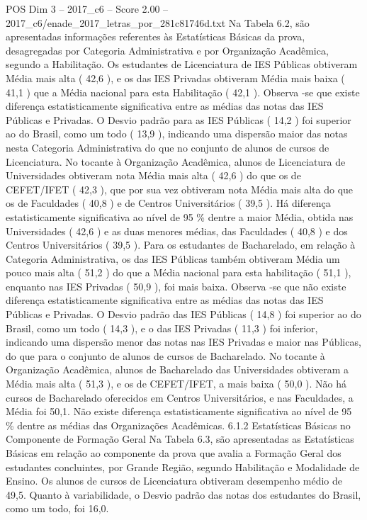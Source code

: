 \begin{textsample}{POS Dim 3 – 2017\_c6 – Score 2.00 – 2017\_c6/enade\_2017\_letras\_por\_281c81746d.txt}
Na Tabela 6.2, são apresentadas informações referentes às Estatísticas Básicas da prova, desagregadas por Categoria Administrativa e por Organização Acadêmica, segundo a Habilitação.
Os estudantes de Licenciatura de IES Públicas obtiveram Média mais alta ( 42,6 ), e os das IES Privadas obtiveram Média mais baixa ( 41,1 ) que a Média nacional para esta Habilitação ( 42,1 ).
Observa -se que existe diferença estatisticamente significativa entre as médias das notas das IES Públicas e Privadas.
O Desvio padrão para as IES Públicas ( 14,2 ) foi superior ao do Brasil, como um todo ( 13,9 ), indicando uma dispersão maior das notas nesta Categoria Administrativa do que no conjunto de alunos de cursos de Licenciatura.
No tocante à Organização Acadêmica, alunos de Licenciatura de Universidades obtiveram nota Média mais alta ( 42,6 ) do que os de CEFET/IFET ( 42,3 ), que por sua vez obtiveram nota Média mais alta do que os de Faculdades ( 40,8 ) e de Centros Universitários ( 39,5 ).
Há diferença estatisticamente significativa ao nível de 95 \% dentre a maior Média, obtida nas Universidades ( 42,6 ) e as duas menores médias, das Faculdades ( 40,8 ) e dos Centros Universitários ( 39,5 ).
Para os estudantes de Bacharelado, em relação à Categoria Administrativa, os das IES Públicas também obtiveram Média um pouco mais alta ( 51,2 ) do que a Média nacional para esta habilitação ( 51,1 ), enquanto nas IES Privadas ( 50,9 ), foi mais baixa.
Observa -se que não existe diferença estatisticamente significativa entre as médias das notas das IES Públicas e Privadas.
O Desvio padrão das IES Públicas ( 14,8 ) foi superior ao do Brasil, como um todo ( 14,3 ), e o das IES Privadas ( 11,3 ) foi inferior, indicando uma dispersão menor das notas nas IES Privadas e maior nas Públicas, do que para o conjunto de alunos de cursos de Bacharelado.
No tocante à Organização Acadêmica, alunos de Bacharelado das Universidades obtiveram a Média mais alta ( 51,3 ), e os de CEFET/IFET, a mais baixa ( 50,0 ).
Não há cursos de Bacharelado oferecidos em Centros Universitários, e nas Faculdades, a Média foi 50,1.
Não existe diferença estatisticamente significativa ao nível de 95 \% dentre as médias das Organizações Acadêmicas. 6.1.2 Estatísticas Básicas no Componente de Formação Geral Na Tabela 6.3, são apresentadas as Estatísticas Básicas em relação ao componente da prova que avalia a Formação Geral dos estudantes concluintes, por Grande Região, segundo Habilitação e Modalidade de Ensino.
Os alunos de cursos de Licenciatura obtiveram desempenho médio de 49,5.
Quanto à variabilidade, o Desvio padrão das notas dos estudantes do Brasil, como um todo, foi 16,0.

\end{textsample}
